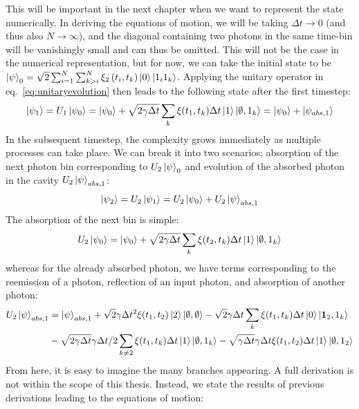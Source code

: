This will be important in the next chapter when we want to represent the state numerically. In deriving the equations of motion, we will be taking $\Delta t \rightarrow 0$ (and thus also $N \rightarrow \infty$), and the diagonal containing two photons in the same time-bin will be vanishingly small and can thus be omitted. This will not be the case in the numerical representation, but for now, we can take the initial state to be $\ket{\psi}_0 = \sqrt{2} \sum_{i=1}^N \sum_{k > i}^N \xi_2\left (t_i,t_k\right ) \ket{0} \ket{1_{i} 1_{k}} $. Applying the unitary operator in eq.~\eqref{eq:unitaryevolution} then leads to the following state after the first timestep:
\begin{equation}
    \ket{\psi_1} = U_1 \ket{\psi_0} = \ket{\psi_0} + \sqrt{2 \gamma \Delta t} \sum_k 
\xi(t_1,t_k) \Delta t \ket{1} \ket{\emptyset,1_k} = \ket{\psi_0} + \ket{\psi_{abs,1}}
\end{equation}
In the subsequent timestep, the complexity grows immediately as multiple processes can take place. We can break it into two scenarios; absorption of the next photon bin corresponding to $U_2 \ket{\psi}_0$ and evolution of the absorbed photon in the cavity  $U_2 \ket{\psi}_{abs,1}$:
\begin{equation}
    \ket{\psi_2} = U_2 \ket{\psi_1} =U_2 \ket{\psi_0} + U_2 \ket{\psi}_{abs,1}  
\end{equation}
The absorption of the next bin is simple:
\begin{equation}
    U_2 \ket{\psi_0} =  \ket{\psi_0} + \sqrt{2 \gamma \Delta t} \sum_k 
\xi(t_2,t_k) \Delta t \ket{1} \ket{\emptyset,1_k}
\end{equation}
whereas for the already absorbed photon, we have terms corresponding to the reemission of a photon, reflection of an input photon, and absorption of another photon:
\begin{align}
 U_2 \ket{\psi}_{abs,1} &= \ket{\psi}_{abs,1} +  \sqrt{2} \gamma \Delta t^2 \xi(t_1,t_2) \ket{2} \ket{\emptyset,\emptyset} - \sqrt{2} \gamma \Delta t \sum_k 
\xi(t_1,t_k) \Delta t \ket{0} \ket{\mathbf{1}_2,1_k}\\ &- \sqrt{2 \gamma \Delta t} \gamma \Delta t /2 \sum_{k \neq 2} 
\xi(t_1,t_k) \Delta t \ket{1} \ket{\emptyset,1_k} 
 - \sqrt{\gamma \Delta t} \gamma \Delta t \xi(t_1,t_2) \Delta t \ket{1} \ket{\emptyset,1_2} 
\end{align}
From here, it is easy to imagine the many branches appearing. A full derivation is not within the scope of this thesis. Instead, we state the results of previous derivations \cite{Korsgaard2021Few-PhotonThesis} leading to the equations of motion:

